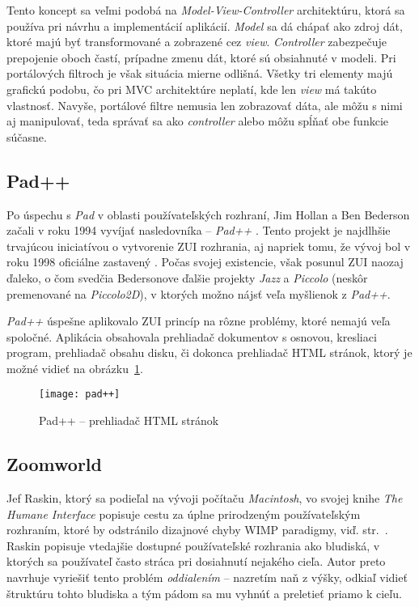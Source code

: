 Tento koncept sa veľmi podobá na \textit{Model-View-Controller} \cite{mvc} architektúru, ktorá sa používa pri návrhu a implementácií aplikácií. \textit{Model} sa dá chápať ako zdroj dát, ktoré majú byť transformované a zobrazené cez \textit{view}. \textit{Controller} zabezpečuje prepojenie oboch častí, prípadne zmenu dát, ktoré sú obsiahnuté v modeli. Pri portálových filtroch je však situácia mierne odlišná. Všetky tri elementy majú grafickú podobu, čo pri MVC architektúre neplatí, kde len \textit{view} má takúto vlastnosť. Navyše, portálové filtre nemusia len zobrazovať dáta, ale môžu s nimi aj manipulovať, teda správať sa ako \textit{controller} alebo môžu spĺňať obe funkcie súčasne.

\subsection{Pad++} \label{sec:pad++}

Po úspechu s \textit{Pad} v oblasti používateľských rozhraní, Jim Hollan a Ben Bederson začali v roku 1994 vyvíjať nasledovníka -- \textit{Pad++} \cite{pad++1}. Tento projekt je najdlhšie trvajúcou iniciatívou o vytvorenie ZUI rozhrania, aj napriek tomu, že vývoj bol v roku 1998 oficiálne zastavený \cite{pad++2}. Počas svojej existencie, však posunul ZUI naozaj ďaleko, o čom svedčia Bedersonove ďalšie projekty \textit{Jazz} \cite{jazz} a \textit{Piccolo} \cite{piccolo} (neskôr premenované na \textit{Piccolo2D}), v ktorých možno nájsť veľa myšlienok z \textit{Pad++}.

\textit{Pad++} úspešne aplikovalo ZUI princíp na rôzne problémy, ktoré nemajú veľa spoločné. Aplikácia obsahovala prehliadač dokumentov s osnovou, kresliaci program, prehliadač obsahu disku, či dokonca prehliadač HTML stránok, ktorý je možné vidieť na obrázku~\ref{fig:pad++}.

\begin{figure}[ht]
 \texttt{[image: pad++]}
 \caption{Pad++ -- prehliadač HTML stránok\label{fig:pad++}}
\end{figure}

\subsection{Zoomworld}

Jef Raskin, ktorý sa podieľal na vývoji počítaču \textit{Macintosh}, vo svojej knihe \textit{The Humane Interface} \cite{humane_interface} popisuje cestu za úplne prirodzeným používateľským rozhraním, ktoré by odstránilo dizajnové chyby WIMP paradigmy, viď. str.~\pageref{sec:wimp}. Raskin popisuje vtedajšie dostupné používateľské rozhrania ako bludiská, v ktorých sa používateľ často stráca pri dosiahnutí nejakého cieľa. Autor preto navrhuje vyriešiť tento problém \textit{oddialením} -- nazretím naň z výšky, odkiaľ vidieť štruktúru tohto bludiska a tým pádom sa mu vyhnúť a preletieť priamo k cieľu.

